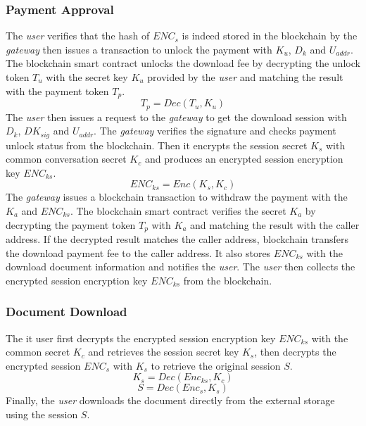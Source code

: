 \documentclass[conference]{IEEEtran}
\begin{document}
\subsubsection{Payment Approval}
The {\it user} verifies that the hash of $ENC_s$ is indeed stored in the blockchain by the {\it gateway} then issues a transaction to unlock the payment with $K_u$, $D_k$ and $U_{addr}$. The blockchain smart contract unlocks the download fee by decrypting the unlock token $T_u$ with the secret key $K_u$ provided by the {\it user} and matching the result with the payment token $T_p$. 
\begin{equation}
\label{eq-d-6} 
T_p = Dec (T_u, K_u)
\end{equation}
The {\it user} then issues a request to the {\it gateway} to get the download session with $D_k$, $DK_{sig}$ and $U_{addr}$. The {\it gateway} verifies the signature and checks payment unlock status from the  blockchain. Then it encrypts the session secret $K_s$ with common conversation secret $K_c$ and produces an encrypted session encryption key $ENC_{ks}$.
\begin{equation}
\label{eq-d-7} 
ENC_{ks} = Enc (K_s, K_c)
\end{equation}
The {\it gateway} issues a blockchain transaction to withdraw the payment with the $K_a$ and $ENC_{ks}$. The blockchain smart contract verifies the secret $K_a$ by decrypting the payment token $T_p$ with $K_a$ and matching the result with the caller address. If the decrypted result matches the caller address, blockchain transfers the download payment fee to the caller address. It also stores $ENC_{ks}$ with the download document information and notifies the {\it user}. The {\it user} then collects the encrypted session encryption key $ENC_{ks}$ from the blockchain.

\subsubsection{Document Download}
The {it user} first decrypts the encrypted session encryption key $ENC_{ks}$ with the common secret $K_c$ and retrieves the session secret key $K_s$, then decrypts the encrypted session $ENC_s$ with $K_s$ to retrieve the original session $S$.
\begin{equation}
\label{eq-d-8} 
K_s = Dec (Enc_{ks}, K_c)
\end{equation}
\begin{equation}
\label{eq-d-9} 
S = Dec (Enc_s, K_s)
\end{equation}
Finally, the {\it user} downloads the document directly from the external storage using the session $S$.
\end{document}
